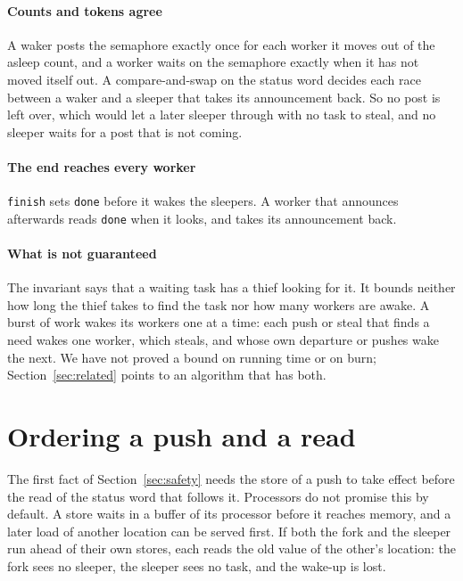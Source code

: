 \documentclass[sigplan,nonacm]{acmart}
\begin{document}
\paragraph{Counts and tokens agree}
%
A waker posts the semaphore exactly once for each worker it moves out
of the asleep count, and a worker waits on the semaphore exactly when
it has not moved itself out.
%
A compare-and-swap on the status word decides each race between a
waker and a sleeper that takes its announcement back.
%
So no post is left over, which would let a later sleeper through with
no task to steal, and no sleeper waits for a post that is not coming.

\paragraph{The end reaches every worker}
%
\lstinline|finish| sets \lstinline|done| before it wakes the sleepers.
%
A worker that announces afterwards reads \lstinline|done| when it
looks, and takes its announcement back.

\paragraph{What is not guaranteed}
%
The invariant says that a waiting task has a thief looking for it.
%
It bounds neither how long the thief takes to find the task nor how
many workers are awake.
%
A burst of work wakes its workers one at a time: each push or steal
that finds a need wakes one worker, which steals, and whose own
departure or pushes wake the next.
%
We have not proved a bound on running time or on burn;
Section~\ref{sec:related} points to an algorithm that has both.

\section{Ordering a push and a read}
\label{sec:order}

The first fact of Section~\ref{sec:safety} needs the store of a push
to take effect before the read of the status word that follows it.
%
Processors do not promise this by default.
%
A store waits in a buffer of its processor before it reaches memory,
and a later load of another location can be served first.
%
If both the fork and the sleeper run ahead of their own stores, each
reads the old value of the other's location: the fork sees no sleeper,
the sleeper sees no task, and the wake-up is lost.
\end{document}
